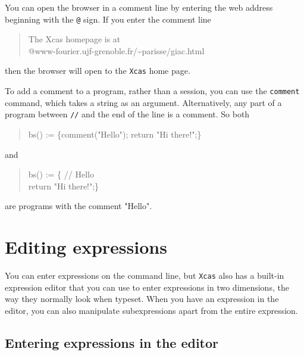 \documentclass[a4paper,11pt]{book}
\newenvironment{giaccmd}
{\begin{quote}\ttfamily}
{\end{quote}}
\begin{document}
You can open the browser in a comment line by entering the web address
beginning with the \texttt{@} sign.  If you enter the comment line
\begin{giaccmd}
The Xcas homepage is at\\
@www-fourier.ujf-grenoble.fr/\~{}parisse/giac.html
\end{giaccmd}
then the browser will open to the \texttt{Xcas} home page.

To add a comment to a program, rather than a session, you can use the
\texttt{comment} command, which takes a string as an argument.
Alternatively, any part of a program between \texttt{//}\index{//} and the end
of the line is a comment.  So both
\begin{giaccmd}
bs() := \{comment("Hello"); return "Hi there!";\}
\end{giaccmd}
and
\begin{giaccmd}
bs() := \{ // Hello\\
       return "Hi there!";\}
\end{giaccmd}
are programs with the comment "Hello".

\section{Editing expressions}

You can enter expressions on the command line, but \texttt{Xcas} also
has a built-in expression editor that you can use to enter expressions
in two dimensions, the way they normally look when typeset.  When you
have an expression in the editor, you can also manipulate
subexpressions apart from the entire expression.

\subsection{Entering expressions in the editor}
\end{document}
